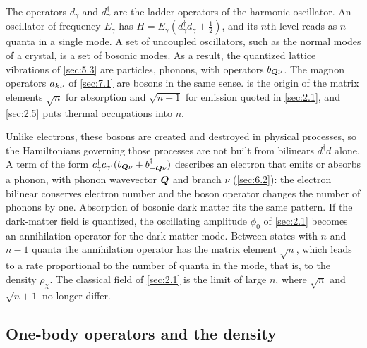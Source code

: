 The operators $d_\gamma$ and $d^\dagger_\gamma$ are the ladder operators of the harmonic oscillator. An oscillator of frequency $E_\gamma$ has $H = E_\gamma(d^\dagger_\gamma d_\gamma + \tfrac12)$, and its $n$th level reads as $n$ quanta in a single mode. A set of uncoupled oscillators, such as the normal modes of a crystal, is a set of bosonic modes. As a result, the quantized lattice vibrations of \cref{sec:5.3} are particles, phonons, with operators $b_{\bm{Q}\nu}$. The magnon operators $a_{\bm{k}\nu}$ of \cref{sec:7.1} are bosons in the same sense.  is the origin of the matrix elements $\sqrt{n}$ for absorption and $\sqrt{n + 1}$ for emission quoted in \cref{sec:2.1}, and \cref{sec:2.5} puts thermal occupations into $n$.

Unlike electrons, these bosons are created and destroyed in physical processes, so the Hamiltonians governing those processes are not built from bilinears $d^\dagger d$ alone. A term of the form $c^\dagger_{\gamma}c_{\gamma'}(b_{\bm{Q}\nu} + b^\dagger_{-\bm{Q}\nu})$ describes an electron that emits or absorbs a phonon, with phonon wavevector $\bm{Q}$ and branch $\nu$ (\cref{sec:6.2}): the electron bilinear conserves electron number and the boson operator changes the number of phonons by one. Absorption of bosonic dark matter fits the same pattern. If the dark-matter field is quantized, the oscillating amplitude $\phi_0$ of \cref{sec:2.1} becomes an annihilation operator for the dark-matter mode. Between states with $n$ and $n - 1$ quanta the annihilation operator has the matrix element $\sqrt{n}$, which leads to a rate proportional to the number of quanta in the mode, that is, to the density $\rho_\chi$. The classical field of \cref{sec:2.1} is the limit of large $n$, where $\sqrt{n}$ and $\sqrt{n+1}$ no longer differ.

\subsection{One-body operators and the density}

